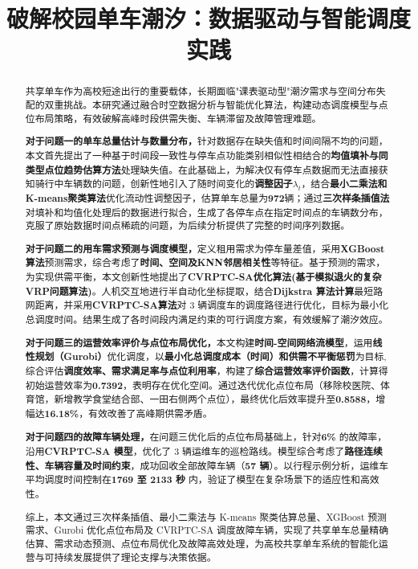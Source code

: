 \documentclass[withoutpreface,bwprint]{cumcmthesis}
\title{破解校园单车潮汐：数据驱动与智能调度实践}  %
\begin{document}
\maketitle
\begin{abstract}
共享单车作为高校短途出行的重要载体，长期面临"课表驱动型"潮汐需求与空间分布失配的双重挑战。本研究通过融合时空数据分析与智能优化算法，构建动态调度模型与点位布局策略，有效破解高峰时段供需失衡、车辆滞留及故障管理难题。

\textbf{对于问题一的单车总量估计与数量分布，}针对数据存在缺失值和时间间隔不均的问题，本文首先提出了一种基于时间段一致性与停车点功能类别相似性相结合的\textbf{均值填补与同类型点位趋势估算方法}处理缺失值。在此基础上，为解决仅有停车点数据而无法直接获知骑行中车辆数的问题，创新性地引入了随时间变化的\textbf{调整因子$\lambda_t$}，结合\textbf{最小二乘法和K-means聚类算法}优化流动性调整因子，估算单车总量为\textbf{972}辆；通过\textbf{三次样条插值法}对填补和均值化处理后的数据进行拟合，生成了各停车点在指定时间点的车辆数分布，克服了原始数据时间点稀疏的问题，为后续分析提供了完整的时间序列数据。

\textbf{对于问题二的用车需求预测与调度模型，}定义租用需求为停车量差值，采用\textbf{XGBoost算法}预测需求，综合考虑了\textbf{时间、空间及KNN邻居相关性}等特征。基于预测的需求，为实现供需平衡，本文创新性地提出了\textbf{CVRPTC-SA优化算法(基于模拟退火的复杂VRP问题算法)}。人机交互地进行半自动化坐标提取，结合\textbf{Dijkstra 算法计算}最短路网距离，并采用\textbf{CVRPTC-SA算法}对 3 辆调度车的调度路径进行优化，目标为最小化总调度时间。结果生成了各时间段内满足约束的可行调度方案，有效缓解了潮汐效应。

\textbf{对于问题三的运营效率评价与点位布局优化，}本文构建\textbf{时间-空间网络流模型}，运用\textbf{线性规划（Gurobi）}优化调度，以\textbf{最小化总调度成本（时间）和供需不平衡惩罚}为目标,综合评估\textbf{调度效率、需求满足率与点位利用率}，构建了\textbf{综合运营效率评价函数}，计算得初始运营效率为\textbf{0.7392}，表明存在优化空间。通过迭代优化点位布局（移除校医院、体育馆，新增教学食堂结合部、一田右侧两个点位），最终优化后效率提升至\textbf{0.8588}，增幅达\textbf{16.18\%}，有效改善了高峰期供需矛盾。

\textbf{对于问题四的故障车辆处理，}在问题三优化后的点位布局基础上，针对\textbf{6\%} 的故障率，沿用\textbf{CVRPTC-SA 模型}，优化了 3 辆运维车的巡检路线。模型综合考虑了\textbf{路径连续性、车辆容量及时间约束}，成功回收全部故障车辆（\textbf{57 辆}）。以行程示例分析，运维车平均调度时间控制在\textbf{1769 至 2133 秒} 内，验证了模型在复杂场景下的适应性和高效性。

综上，本文通过三次样条插值、最小二乘法与 K-means 聚类估算总量、XGBoost 预测需求、Gurobi 优化点位布局及 CVRPTC-SA 调度故障车辆，实现了共享单车总量精确估算、需求动态预测、点位布局优化及故障高效处理，为高校共享单车系统的智能化运营与可持续发展提供了理论支撑与决策依据。

\end{abstract}
\end{document}
